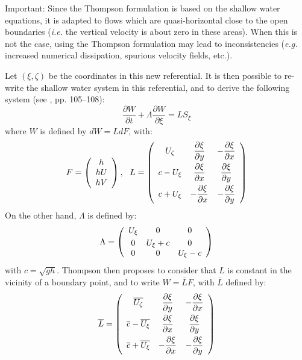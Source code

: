 \begin{WarningBlock}{Important:}
Since the Thompson formulation is based on the shallow water equations,
it is adapted to flows which are quasi-horizontal close to the open boundaries
(\textit{i.e.} the vertical velocity is about zero in these areas).
When this is not the case, using the Thompson formulation may lead to inconsistencies
(\textit{e.g.} increased numerical dissipation, spurious velocity fields, etc.).
\end{WarningBlock}

Let $(\xi, \zeta)$ be the coordinates in this new referential.
It is then possible to re-write the shallow water system in this referential,
and to derive the following system (see \cite{hervouet007}, pp. 105--108):
\begin{equation}
\dfrac{\partial W}{\partial t} + \Lambda \dfrac{\partial W}{\partial \xi} = LS_\xi
\end{equation}
where $W$ is defined by $dW=LdF$, with:
\begin{equation}
F=\left(\begin{array}{c}h \\ hU \\ hV\end{array}\right), ~~
L=\left(\begin{array}{ccc}
U_\zeta & \dfrac{\partial \xi}{\partial y} & -\dfrac{\partial \xi}{\partial x}\smallskip\\
c-U_\xi & \dfrac{\partial \xi}{\partial x} & \dfrac{\partial \xi}{\partial y}\smallskip\\
c+U_\xi & -\dfrac{\partial \xi}{\partial x} & -\dfrac{\partial \xi}{\partial y}
\end{array}\right)
\end{equation}
On the other hand, $\Lambda$ is defined by:
\begin{equation}
\Lambda=\left(\begin{array}{ccc}U_\xi & 0 & 0 \smallskip \\
0 & U_\xi+c & 0 \\ 0 & 0 & U_\xi-c\end{array}\right)
\end{equation}
with $c=\sqrt{gh}$. Thompson then proposes to consider that $L$ is constant in the
vicinity of a boundary point, and to write $W=\overline{L}F$, with $\overline{L}$ defined by:
\begin{equation}
\overline{L}=\left(\begin{array}{ccc}
\overline{U_\zeta} & \dfrac{\partial \xi}{\partial y} & -\dfrac{\partial \xi}{\partial x}\smallskip\\
\overline{c}-\overline{U_\xi} & \dfrac{\partial \xi}{\partial x} & \dfrac{\partial \xi}{\partial y}\smallskip\\
\overline{c}+\overline{U_\xi} & -\dfrac{\partial \xi}{\partial x} & -\dfrac{\partial \xi}{\partial y}
\end{array}\right)
\end{equation}

